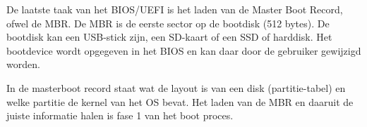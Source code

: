 De laatste taak van het BIOS/UEFI is het laden van de Master Boot Record, ofwel de MBR. De MBR is de eerste sector op de bootdisk (512 bytes). De bootdisk kan een USB-stick zijn, een SD-kaart of een SSD of harddisk. Het bootdevice wordt opgegeven in het BIOS en kan daar door de gebruiker gewijzigd worden.

In de masterboot record staat wat de layout is van een disk (partitie-tabel) en welke partitie de kernel van het OS bevat. Het laden van de MBR en daaruit de juiste informatie halen is fase 1 van het boot proces.

